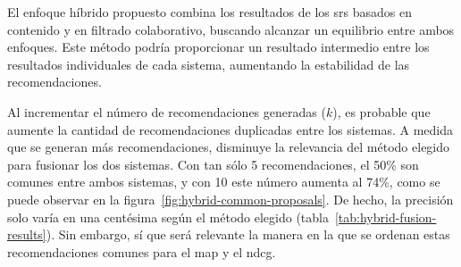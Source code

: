 
El enfoque híbrido propuesto combina los resultados de los \glspl{sr} basados en contenido y en filtrado colaborativo, buscando alcanzar un equilibrio entre ambos enfoques. Este método podría proporcionar un resultado intermedio entre los resultados individuales de cada sistema, aumentando la estabilidad de las recomendaciones.

Al incrementar el número de recomendaciones generadas ($k$), es probable que aumente la cantidad de recomendaciones duplicadas entre los sistemas. A medida que se generan más recomendaciones, disminuye la relevancia del método elegido para fusionar los dos sistemas. Con tan sólo 5 recomendaciones, el 50\% son comunes entre ambos sistemas, y con 10 este número aumenta al 74\%, como se puede observar en la figura~\ref{fig:hybrid-common-proposals}. De hecho, la precisión solo varía en una centésima según el método elegido (tabla~\ref{tab:hybrid-fusion-results}). Sin embargo, sí que será relevante la manera en la que se ordenan estas recomendaciones comunes para el \gls{map} y el \gls{ndcg}.


